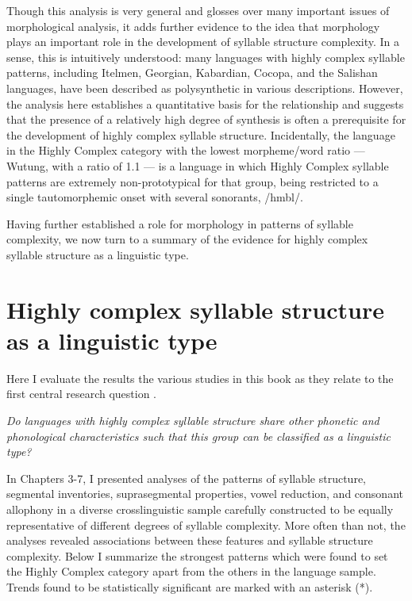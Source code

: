   Though this analysis is very general and glosses over many important issues of morphological analysis, it adds further evidence to the idea that morphology plays an important role in the development of syllable structure complexity. In a sense, this is intuitively understood: many languages with highly complex syllable patterns, including Itelmen, Georgian, Kabardian, Cocopa, and the Salishan languages, have been described as polysynthetic in various descriptions. However, the analysis here establishes a quantitative basis for the relationship and suggests that the presence of a relatively high degree of synthesis is often a prerequisite for the development of highly complex syllable structure. Incidentally, the language in the Highly Complex category with the lowest morpheme/word ratio — Wutung, with a ratio of 1.1 — is a language in which Highly Complex syllable patterns are extremely non-prototypical for that group, being restricted to a single tautomorphemic onset with several sonorants, /hmbl/.

  Having further established a role for morphology in patterns of syllable complexity, we now turn to a summary of the evidence for highly complex syllable structure as a linguistic type.

\section{Highly complex syllable structure as a linguistic type}\label{sec:8.3}

  Here I evaluate the results the various studies in this book as they relate to the first central research question .

\ea\label{ex:8.1}
   \textit{Do languages with highly complex syllable structure share other phonetic and phonological characteristics such that this group can be classified as a linguistic type?}
\z

  In Chapters 3-7, I presented analyses of the patterns of syllable structure, segmental inventories, suprasegmental properties, vowel reduction, and consonant allophony in a diverse crosslinguistic sample carefully constructed to be equally representative of different degrees of syllable complexity. More often than not, the analyses revealed associations between these features and syllable structure complexity. Below I summarize the strongest patterns which were found to set the Highly Complex category apart from the others in the language sample. Trends found to be statistically significant are marked with an asterisk (*).

